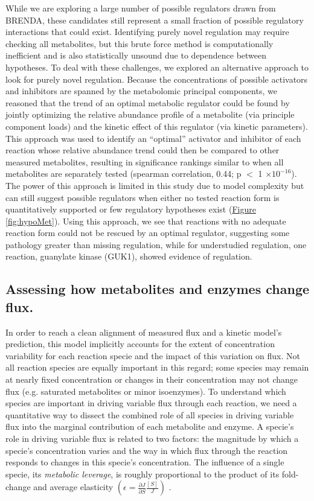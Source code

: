 While we are exploring a large number of possible regulators drawn from BRENDA, these candidates still represent a small fraction of possible regulatory interactions that could exist. Identifying purely novel regulation may require checking all metabolites, but this brute force method is computationally inefficient and is also statistically unsound due to dependence between hypotheses. To deal with these challenges, we explored an alternative approach to look for purely novel regulation. Because the concentrations of possible activators and inhibitors are spanned by the metabolomic principal components, we reasoned that the trend of an optimal metabolic regulator could be found by jointly optimizing the relative abundance profile of a metabolite (via principle component loads) and the kinetic effect of this regulator (via kinetic parameters). This approach was used to identify an ``optimal'' activator and inhibitor of each reaction whose relative abundance trend could then be compared to other measured metabolites, resulting in significance rankings similar to when all metabolites are separately tested (spearman correlation, 0.44; p $<$ 1 $\times 10^{-16}$). The power of this approach is limited in this study due to model complexity but can still suggest possible regulators when either no tested reaction form is quantitatively supported or few regulatory hypotheses exist (\hyperref[fig:hypoMet]{Figure \ref{fig:hypoMet}}). Using this approach, we see that reactions with no adequate reaction form could not be rescued by an optimal regulator, suggesting some pathology greater than missing regulation, while for understudied regulation, one reaction, guanylate kinase (GUK1), showed evidence of regulation.

\subsection{Assessing how metabolites and enzymes change flux.}

In order to reach a clean alignment of measured flux and a kinetic model's prediction, this model implicitly accounts for the extent of concentration variability for each reaction specie and the impact of this variation on flux.  Not all reaction species are equally important in this regard; some species may remain at nearly fixed concentration or changes in their concentration may not change flux (e.g. saturated metabolites or minor isoenzymes).  To understand which species are important in driving variable flux through each reaction, we need a quantitative way to dissect the combined role of all species in driving variable flux into the marginal contribution of each metabolite and enzyme.  A specie's role in driving variable flux is related to two factors: the magnitude by which a specie's concentration varies and the way in which flux through the reaction responds to changes in this specie's concentration.  The influence of a single specie, its \textit{metabolic leverage}, is roughly proportional to the product of its fold-change and average elasticity $\left(\epsilon = \frac{\partial J}{\partial S}\frac{[S]}{J}\right)$ \cite{Kacser:1973fe, Liao:1993in}.

